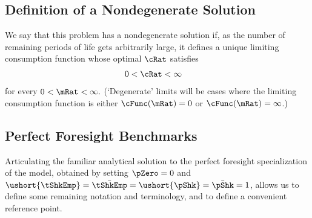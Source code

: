 \documentclass[./BufferStockTheory.tex]{subfiles}
\begin{document}
\hypertarget{Definition-of-a-Nondegenerate-Solution}{}
\subsection{Definition of a Nondegenerate Solution}

We say that this problem has a nondegenerate solution if, as the number of remaining periods of life gets arbitrarily large, it
defines a unique limiting consumption function whose optimal
$\cRat$ satisfies
\begin{equation}\begin{gathered}\begin{aligned}
  0 & < \cRat <  \infty 
\end{aligned}\end{gathered}\end{equation}
for every $0 < \mRat < \infty.$ (`Degenerate' limits will be cases
where the limiting consumption function is either $\cFunc(\mRat)=0$ or $\cFunc(\mRat)=\infty$.)

\hypertarget{Perfect-Foresight-Benchmarks}{}
\subsection{Perfect Foresight Benchmarks}

Articulating the familiar analytical solution to the perfect foresight specialization of the model, obtained by setting $\pZero=0$ and $\ushort{\tShkEmp}=\bar{\tShkEmp}=\ushort{\pShk}=\bar{\pShk}=1$, allows us to define some remaining notation and terminology, and to define a convenient reference point.

\hypertarget{Human-Wealth}{}
\end{document}
